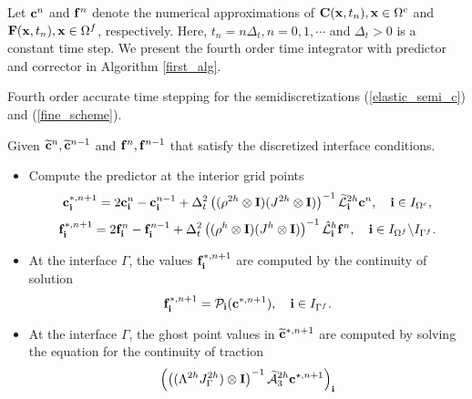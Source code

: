 Let ${\bf c}^{n}$ and ${\bf f}^{n}$ denote the numerical approximations of ${\bf C}({\bf x},t_n), {\bf x}\in\Omega^c$ and ${\bf F}({\bf x},t_n), {\bf x}\in\Omega^f$, respectively. Here, $t_n = n\Delta_t, n = 0,1,\cdots$ and $\Delta_t > 0$ is a constant time step. We present the fourth order time integrator with predictor and corrector in  Algorithm \ref{first_alg}.
~\\
\begin{breakablealgorithm}
	\caption{Fourth order accurate time stepping for the semidiscretizations  (\ref{elastic_semi_c}) and  (\ref{fine_scheme}). }\label{first_alg}
	Given  $\widetilde{{\bf c}}^{n}, \widetilde{{\bf c}}^{n-1}$ and ${\bf f}^{n}, {\bf f}^{n-1}$ that satisfy the discretized interface conditions.
	
	\begin{itemize}
		\item  {Compute the predictor at the interior grid points %
			\[{\bf c}^{*,n+1}_{\bf i} = 2{\bf c}^{n}_{\bf i} - {\bf c}^{n-1}_{\bf i} + \Delta_t^2\left((\rho^{2h}\otimes{\bf I})(J^{2h}\otimes{\bf I})\right)^{-1}{\widetilde{\mathcal{L}}}^{2h}_{\bf i} {\bf{c}}^{n},\quad {\bf i}\in I_{\Omega^c},\]
			\[{\bf f}^{*,n+1}_{\bf i} = 2{\bf f}^{n}_{\bf i} - {\bf f}^{n-1}_{\bf i} + \Delta_t^2\left((\rho^{h}\otimes{\bf I})(J^{h}\otimes{\bf I})\right)^{-1}\hat{\mathcal{L}}^{h}_{\bf i} {\bf{f}}^{n},\quad {\bf i}\in I_{\Omega^f}\backslash I_{\Gamma^f}.\]
		}
		\item{At the interface $\Gamma$, the values ${\bf f}^{*,n+1}_{\bf i}$  are computed by the continuity of solution 
			\begin{equation*}
			{\bf f}^{*,n+1}_{\bf i} = {\mathcal{P}}_{\bf i}({\bf c}^{*,n+1}),\quad {\bf i}\in I_{\Gamma^f}.
			\end{equation*}
		}
		\item{At the interface $\Gamma$, the ghost point values in $\widetilde{\bf c}^{*,n+1}$ are computed by solving the equation for the continuity of traction 
				\begin{equation}\label{traction_gamma_pre}
			\left(\left((\Lambda^{2h}J^{2h}_{\Gamma})\otimes{\bf I}\right)^{-1}\wt{\mathcal{A}}_3^{2h}{\bf c}^{\star,n+1}\right)_{\bf i}

\end{equation}}
\end{itemize}
\end{breakablealgorithm}
